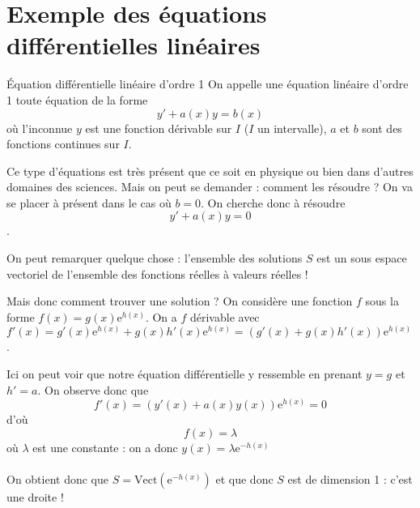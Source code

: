 \documentclass{classe}
\begin{document}

\section{Exemple des équations différentielles linéaires}

\begin{définition}{Équation différentielle linéaire d'ordre 1}{}
On appelle une équation linéaire d'ordre 1 toute équation de la forme
$$y' + a(x)y = b(x)$$
où l'inconnue $y$ est une fonction dérivable sur $I$ ($I$ un intervalle), $a$ et $b$ sont des fonctions continues sur $I$.
\end{définition}

Ce type d'équations est très présent que ce soit en physique ou bien dans d'autres domaines des sciences. Mais on peut se demander : comment les résoudre ? On va se placer à présent dans le cas où $b=0$. On cherche donc à résoudre
$$y' + a(x)y = 0$$.

On peut remarquer quelque chose : l'ensemble des solutions $S$ est un sous espace vectoriel de l'ensemble des fonctions réelles à valeurs réelles !

Mais donc comment trouver une solution ? On considère une fonction $f$ sous la forme $f(x) = g(x)\mathrm{e}^{h(x)}$. On a $f$ dérivable avec $f'(x) = g'(x)\mathrm{e}^{h(x)} + g(x)h'(x)\mathrm{e}^{h(x)} = (g'(x) + g(x)h'(x))\mathrm{e}^{h(x)}$.

Ici on peut voir que notre équation différentielle y ressemble en prenant $y = g$ et $h' = a$. On observe donc que
$$f'(x) = (y'(x) + a(x)y(x))\mathrm{e}^{h(x)} = 0$$
d'où
$$f(x) = \lambda$$
où $\lambda$ est une constante : on a donc $y(x) = \lambda\mathrm{e}^{-h(x)}$
\\\\
On obtient donc que $S = \mathrm{Vect}(\mathrm{e}^{-h(x)})$ et que donc $S$ est de dimension 1 : c'est une droite !
\end{document}
